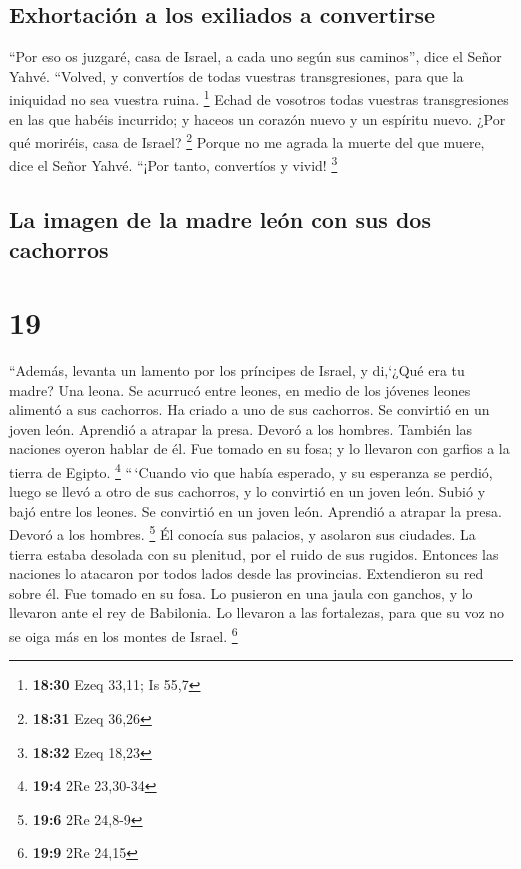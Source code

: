 \hypertarget{exhortaciuxf3n-a-los-exiliados-a-convertirse}{%
\subsection{Exhortación a los exiliados a
convertirse}\label{exhortaciuxf3n-a-los-exiliados-a-convertirse}}

 ``Por eso os juzgaré, casa de Israel, a cada uno según
sus caminos'', dice el Señor Yahvé. ``Volved, y convertíos de todas
vuestras transgresiones, para que la iniquidad no sea vuestra ruina.
\footnote{\textbf{18:30} Ezeq 33,11; Is 55,7}  Echad de
vosotros todas vuestras transgresiones en las que habéis incurrido; y
haceos un corazón nuevo y un espíritu nuevo. ¿Por qué moriréis, casa de
Israel? \footnote{\textbf{18:31} Ezeq 36,26}  Porque no
me agrada la muerte del que muere, dice el Señor Yahvé. ``¡Por tanto,
convertíos y vivid! \footnote{\textbf{18:32} Ezeq 18,23}

\hypertarget{la-imagen-de-la-madre-leuxf3n-con-sus-dos-cachorros}{%
\subsection{La imagen de la madre león con sus dos
cachorros}\label{la-imagen-de-la-madre-leuxf3n-con-sus-dos-cachorros}}

\hypertarget{section-18}{%
\section{19}\label{section-18}}

 ``Además, levanta un lamento por los príncipes de Israel,
 y di,`¿Qué era tu madre? Una leona. Se acurrucó entre
leones, en medio de los jóvenes leones alimentó a sus cachorros.
 Ha criado a uno de sus cachorros. Se convirtió en un
joven león. Aprendió a atrapar la presa. Devoró a los hombres.
 También las naciones oyeron hablar de él. Fue tomado en
su fosa; y lo llevaron con garfios a la tierra de Egipto. \footnote{\textbf{19:4}
  2Re 23,30-34}  ``\,`Cuando vio que había esperado, y su
esperanza se perdió, luego se llevó a otro de sus cachorros, y lo
convirtió en un joven león.  Subió y bajó entre los
leones. Se convirtió en un joven león. Aprendió a atrapar la presa.
Devoró a los hombres. \footnote{\textbf{19:6} 2Re 24,8-9} 
Él conocía sus palacios, y asolaron sus ciudades. La tierra estaba
desolada con su plenitud, por el ruido de sus rugidos. 
Entonces las naciones lo atacaron por todos lados desde las provincias.
Extendieron su red sobre él. Fue tomado en su fosa.  Lo
pusieron en una jaula con ganchos, y lo llevaron ante el rey de
Babilonia. Lo llevaron a las fortalezas, para que su voz no se oiga más
en los montes de Israel. \footnote{\textbf{19:9} 2Re 24,15}

